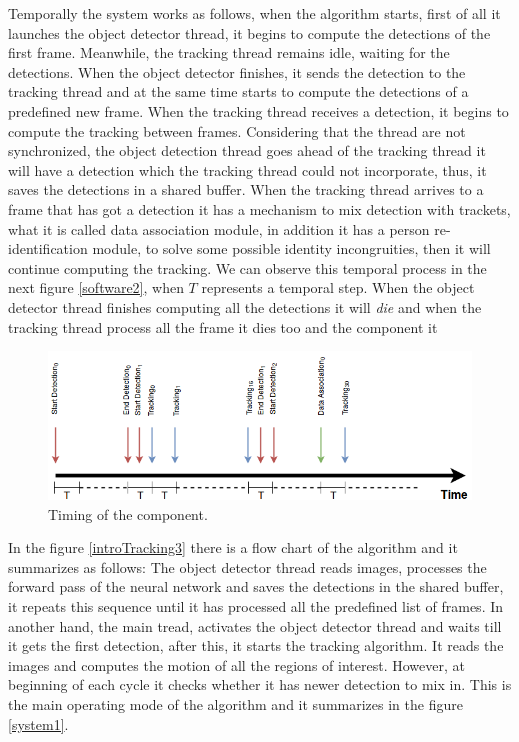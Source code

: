 Temporally the system works as follows, when the algorithm starts, first of all it launches the object detector thread, it begins to compute the detections of the first frame. Meanwhile, the tracking thread remains idle, waiting for the detections. When the object detector finishes, it sends the detection to the tracking thread and at the same time starts to compute the detections of a predefined new frame. When the tracking thread receives a detection, it begins to compute the tracking between frames. Considering that the thread are not synchronized, the object detection thread goes ahead of the tracking thread it will have a detection which the tracking thread could not incorporate, thus, it saves the detections in a shared buffer. When the tracking thread arrives to a frame that has got a detection it has a mechanism to mix detection with trackets, what it is called data association module, in addition it has a person re-identification module, to solve some possible identity incongruities, then it will continue computing the tracking. We can observe this temporal process in the next figure \ref{software2}, when $T$ represents a temporal step. When the object detector thread finishes computing all the detections it will \textit{die} and when the tracking thread process all the frame it dies too and the component it 


\begin{figure}[H]
\centering         
\includegraphics[width=14cm]{timesDiagram/timing.png}
\caption{Timing of the component.} \label{intro1}
\end{figure}


In the figure \ref{introTracking3} there is a flow chart of the algorithm and it summarizes as follows: The object detector thread reads images, processes the forward pass of the neural network and saves the detections in the shared buffer, it repeats this sequence until it has processed all the predefined list of frames. In another hand, the main tread, activates the object detector thread and waits till it gets the first detection, after this, it starts the tracking algorithm. It reads the images and computes the motion of all the regions of interest. However, at beginning of each cycle it checks whether it has newer detection to mix in. This is the main operating mode of the algorithm and it summarizes in the figure \ref{system1}. 

